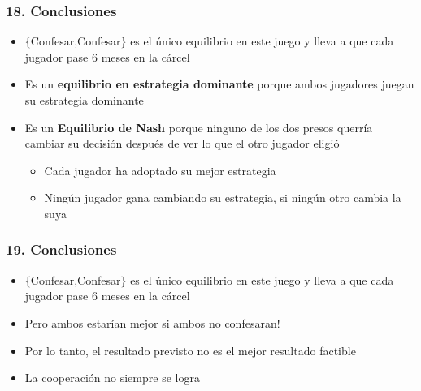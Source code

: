 \documentclass[14pt]{beamer}
\begin{document}
\begin{frame}
\frametitle{18. Conclusiones}
\begin{itemize}
    \item  $\lbrace$Confesar,Confesar$\rbrace$ es el único equilibrio en este juego y lleva a que cada jugador pase 6 meses en la cárcel
    \item Es un \textbf{equilibrio en estrategia dominante} porque ambos jugadores juegan su estrategia dominante
    \item Es un \textbf{Equilibrio de Nash} porque ninguno de los dos presos querría cambiar su decisión después de ver lo que el otro jugador eligió
    \begin{itemize}
        \item Cada jugador ha adoptado su mejor estrategia
        \item Ningún jugador gana cambiando su estrategia, si ningún otro cambia la suya
    \end{itemize}
\end{itemize}
\end{frame}

\begin{frame}
\frametitle{19. Conclusiones}
\begin{itemize}
    \item  $\lbrace$Confesar,Confesar$\rbrace$ es el único equilibrio en este juego y lleva a que cada jugador pase 6 meses en la cárcel
    \item Pero ambos estarían mejor si ambos no confesaran!
    \item Por lo tanto, el resultado previsto no es el mejor resultado factible
    \item La cooperación no siempre se logra
    \end{itemize}
\end{frame}
\end{document}
